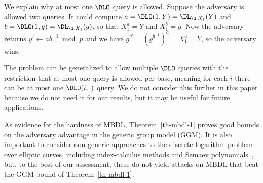 We explain why at most one $\DLO$ query is allowed. Suppose the adversary is allowed two queries. It could compute $a = \DLO(1,Y)=\DL_{\G,X_1}(Y)$ and $b = \DLO(1,g)= \DL_{\G,X_1}(g)$, so that $X_1^{a} = Y$ and $X_1^{b} = g$. Now the adversary returns $y' \gets ab^{-1}\bmod p$ and we have $g^{y'} = (g^{b^{-1}})^a = X_1^a=Y$, so the adversary wins. 

The problem can be generalized to allow multiple  $\DLO$ queries with the restriction that at most one query is allowed per base, meaning for each $i$ there can be at most one $\DLO(i,\cdot)$ query. We do not consider this further in this paper because we do not need it for our results, but it may be useful for future applications.



As evidence for the hardness of MBDL, Theorem~\ref{th-mbdl-1} proves good bounds on the adversary advantage in the generic group model (GGM). It is also important to consider non-generic approaches to the discrete logarithm problem over elliptic curves, including index-calculus methods and Semaev polynomials~\cite{silverman2000xedni,EPRINT:Semaev04,AC:SilSuz98,jacobson2000analysis,galbraith2016recent}, but, to the best of our assessment, these do not yield attacks on MBDL that beat the GGM bound of Theorem~\ref{th-mbdl-1}. 

